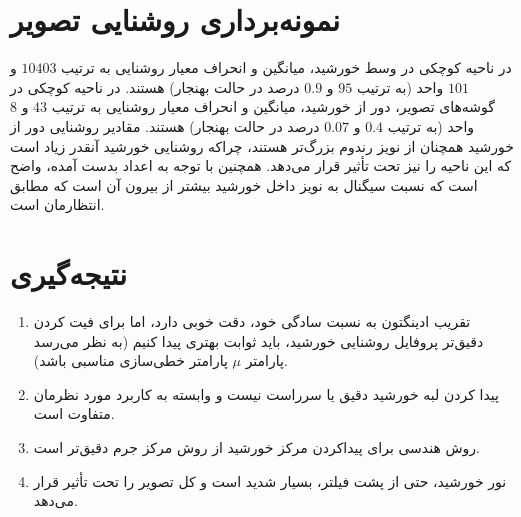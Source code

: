 \documentclass[12pt,a4paper]{article}
\begin{document}
	\section{نمونه‌برداری روشنایی تصویر}
	در ناحیه کوچکی در وسط خورشید، میانگین و انحراف معیار روشنایی به ترتیب $10403$ و $101$ واحد (به ترتیب $95$ و $0.9$
	درصد در حالت بهنجار) هستند. در ناحیه کوچکی در گوشه‌های تصویر، دور از خورشید، میانگین و انحراف معیار روشنایی به
	ترتیب $43$ و $8$ واحد (به ترتیب $0.4$ و $0.07$ درصد در حالت بهنجار) هستند. مقادیر روشنایی دور از خورشید همچنان از
	نویز رندوم بزرگ‌تر هستند، چراکه روشنایی خورشید آنقدر زیاد است که این ناحیه را نیز تحت تأثیر قرار می‌دهد. همچنین
	با توجه به اعداد بدست آمده، واضح است که نسبت سیگنال به نویز داخل خورشید بیشتر از بیرون آن است که مطابق انتظارمان است.
	
	\section{نتیجه‌گیری}
	\begin{enumerate}
		\item تقریب ادینگتون به نسبت سادگی خود، دقت خوبی دارد، اما برای فیت کردن دقیق‌تر پروفایل روشنایی خورشید، باید ثوابت بهتری
		پیدا کنیم (به نظر می‌رسد پارامتر $\mu$ پارامتر خطی‌سازی مناسبی باشد).
		\item پیدا کردن لبه خورشید دقیق یا سرراست نیست و وابسته به کاربرد مورد نظرمان متفاوت است.
		\item روش هندسی برای پیداکردن مرکز خورشید از روش مرکز جرم دقیق‌تر است.
		\item نور خورشید، حتی از پشت فیلتر، بسیار شدید است و کل تصویر را تحت تأثیر قرار می‌دهد.
	\end{enumerate}
	 
\end{document}
